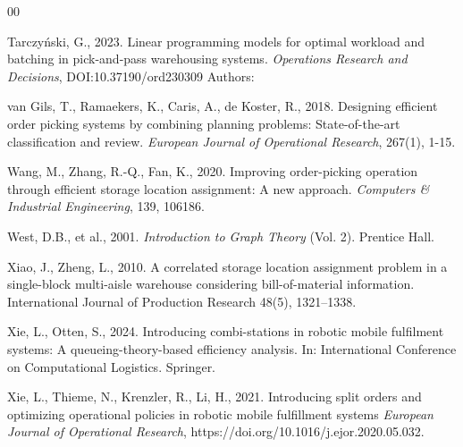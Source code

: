 \documentclass[preprint,review,11pt,authoryear]{elsarticle}
\begin{document}
\begin{thebibliography}{00}

Tarczyński, G., 2023. Linear programming models for optimal workload
and batching in pick-and-pass warehousing systems. \textit{Operations Research and Decisions}, DOI:10.37190/ord230309
Authors:

van Gils, T., Ramaekers, K., Caris, A., de Koster, R., 2018. Designing efficient order picking systems by combining planning problems: State-of-the-art classification and review. \textit{European Journal of Operational Research}, 267(1), 1-15.


Wang, M., Zhang, R.-Q., Fan, K., 2020. Improving order-picking operation through efficient storage location assignment: A new approach. \textit{Computers \& Industrial Engineering}, 139, 106186.

West, D.B., et al., 2001. \textit{Introduction to Graph Theory} (Vol. 2). Prentice Hall.

Xiao, J., Zheng, L., 2010. A correlated storage location assignment problem in a single-block multi-aisle warehouse considering bill-of-material information. International Journal of Production Research 48(5), 1321--1338.

Xie, L., Otten, S., 2024. Introducing combi-stations in robotic mobile fulfilment systems: A queueing-theory-based efficiency analysis. In: International Conference on Computational Logistics. Springer.

Xie, L., Thieme, N., Krenzler, R., Li, H., 2021. Introducing split orders and optimizing operational policies in robotic mobile fulfillment systems \textit{European Journal of Operational Research}, https://doi.org/10.1016/j.ejor.2020.05.032.


\end{thebibliography}
\end{document}
